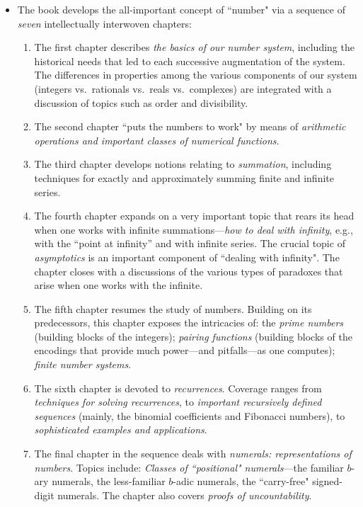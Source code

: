 \documentclass{article}[12pt]
\begin{document}
\begin{itemize}
\begin{itemize}
  \item
The book develops the all-important concept of ``number" via a sequence of {\em seven} intellectually interwoven chapters:
   \begin{enumerate}
   \item       
The first chapter describes {\em the basics of our number system}, including the historical needs that led to each successive augmentation of the system.  The differences in properties among the various components of our system (integers vs.~rationals vs.~reals vs.~complexes) are integrated with a discussion of topics such as order and divisibility.
  \item
The second chapter ``puts the numbers to work" by means of {\em arithmetic operations and important classes of numerical functions}.
  \item
The third chapter develops notions relating to {\em summation}, including techniques for exactly and approximately summing finite and infinite series.
  \item
The fourth chapter expands on a very important topic that rears its head when one works with infinite summations---{\em how to deal with infinity}, e.g.,  with the ``point at infinity'' and with infinite series.  The crucial topic of {\em asymptotics} is an important component of ``dealing with infinity".  The chapter closes with a discussions of the various types of paradoxes that arise when one works with the infinite.
  \item
The fifth chapter resumes the study of numbers.  Building on its predecessors, this chapter exposes the intricacies of: the {\em prime numbers} (building blocks of the integers); {\em pairing functions} (building blocks of the encodings that provide much power---and pitfalls---as one computes); {\em finite number systems}.
  \item
The sixth chapter is devoted to {\em recurrences}.  Coverage ranges from {\em techniques for solving recurrences}, to {\em important recursively defined sequences} (mainly, the binomial coefficients and Fibonacci numbers), to {\em sophisticated examples and applications}.
  \item
The final chapter in the sequence deals with {\em numerals: representations of numbers}.  Topics include: {\em Classes of ``positional" numerals}---the familiar $b$-ary numerals, the less-familiar $b$-adic numerals, the ``carry-free" signed-digit numerals.  The chapter also covers {\em proofs of uncountability}.  
\end{enumerate}


\end{itemize}
\end{itemize}
\end{document}
